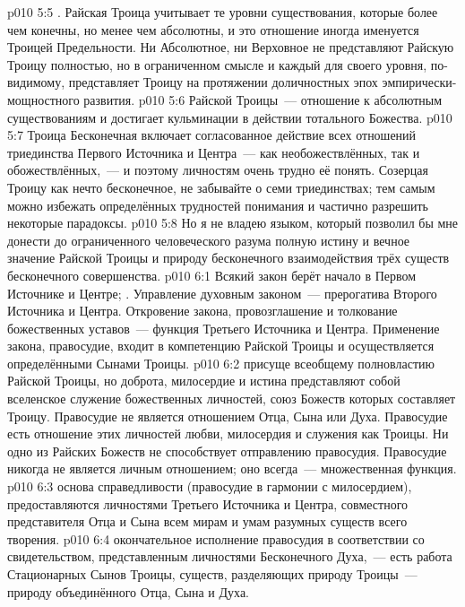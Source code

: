 \vs p010 5:5 . Райская Троица учитывает те уровни существования, которые более чем конечны, но менее чем абсолютны, и это отношение иногда именуется Троицей Предельности. Ни Абсолютное, ни Верховное не представляют Райскую Троицу полностью, но в ограниченном смысле и каждый для своего уровня, по\hyp{}видимому, представляет Троицу на протяжении доличностных эпох эмпирически\hyp{}мощностного развития.
\vs p010 5:6  Райской Троицы~--- отношение к абсолютным существованиям и достигает кульминации в действии тотального Божества.
\vs p010 5:7 \pc Троица Бесконечная включает согласованное действие всех отношений триединства Первого Источника и Центра~--- как необожествлённых, так и обожествлённых,~--- и поэтому личностям очень трудно её понять. Созерцая Троицу как нечто бесконечное, не забывайте о семи триединствах; тем самым можно избежать определённых трудностей понимания и частично разрешить некоторые парадоксы.
\vs p010 5:8 \pc Но я не владею языком, который позволил бы мне донести до ограниченного человеческого разума полную истину и вечное значение Райской Троицы и природу бесконечного взаимодействия трёх существ бесконечного совершенства.
\vs p010 6:1 Всякий закон берёт начало в Первом Источнике и Центре; . Управление духовным законом~--- прерогатива Второго Источника и Центра. Откровение закона, провозглашение и толкование божественных уставов~--- функция Третьего Источника и Центра. Применение закона, правосудие, входит в компетенцию Райской Троицы и осуществляется определёнными Сынами Троицы.
\vs p010 6:2 \pc {} присуще всеобщему полновластию Райской Троицы, но доброта, милосердие и истина представляют собой вселенское служение божественных личностей, союз Божеств которых составляет Троицу. Правосудие не является отношением Отца, Сына или Духа. Правосудие есть отношение этих личностей любви, милосердия и служения как Троицы. Ни одно из Райских Божеств не способствует отправлению правосудия. Правосудие никогда не является личным отношением; оно всегда~--- множественная функция.
\vs p010 6:3 \pc {} основа справедливости (правосудие в гармонии с милосердием), предоставляются личностями Третьего Источника и Центра, совместного представителя Отца и Сына всем мирам и умам разумных существ всего творения.
\vs p010 6:4 \pc {} окончательное исполнение правосудия в соответствии со свидетельством, представленным личностями Бесконечного Духа,~--- есть работа Стационарных Сынов Троицы, существ, разделяющих природу Троицы~--- природу объединённого Отца, Сына и Духа.
